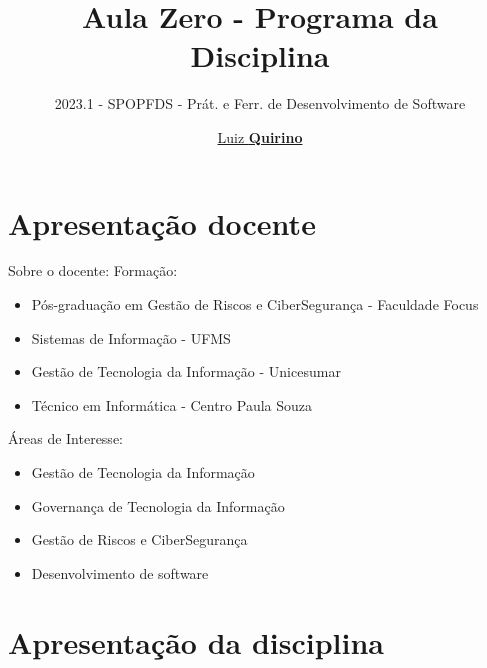 \documentclass{beamer}
\title{Aula Zero - Programa da Disciplina}
\subtitle{2023.1 - SPOPFDS - Prát. e Ferr. de Desenvolvimento de Software}
\author{\href{mailto:luiz.quirino@ifsp.edu.br}{Luiz \textbf{Quirino}}}
\newcommand{\hrefcol}[2]{\textcolor{cyan}{\href{#1}{#2}}}
\begin{document}
\maketitle

%
%


\section{Apresentação docente}

\begin{frame}{Sobre o docente:}
Formação:
\begin{itemize}
\item Pós-graduação em Gestão de Riscos e CiberSegurança - Faculdade Focus
\item Sistemas de Informação - UFMS
\item Gestão de Tecnologia da Informação - Unicesumar
\item Técnico em Informática - Centro Paula Souza
\end{itemize}
Áreas de Interesse:
\begin{itemize}
\item Gestão de Tecnologia da Informação
\item Governança de Tecnologia da Informação
\item Gestão de Riscos e CiberSegurança
\item Desenvolvimento de software
\end{itemize}
\end{frame}

\section{Apresentação da disciplina}
\end{document}
